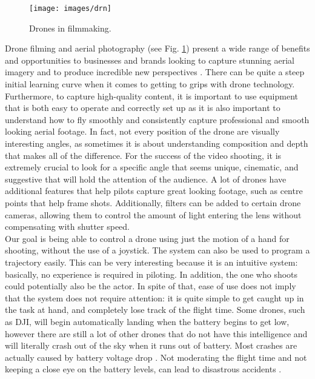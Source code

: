 \begin{figure}[H]
	\centering
	\texttt{[image: images/drn]}
	\caption[Drones in filmmaking.]{Drones in filmmaking.}
	\label{fig:drnfilm}
\end{figure}

\noindent Drone filming and aerial photography (see Fig. \ref{fig:drnfilm}) present a wide range of benefits and opportunities to businesses and brands looking to capture stunning aerial imagery and to produce incredible new perspectives \cite[]{TopTipsf86:online}. There can be quite a steep initial learning curve when it comes to getting to grips with drone technology. Furthermore, to capture high-quality content, it is important to use equipment that is both easy to operate and correctly set up as it is also important to understand how to fly smoothly and consistently capture professional and smooth looking aerial footage. In fact, not every position of the drone are visually interesting angles, as sometimes it is about understanding composition and depth that makes all of the difference. For the success of the video shooting, it is extremely crucial to look for a specific angle that seems unique, cinematic, and suggestive that will hold the attention of the audience. A lot of drones have additional features that help pilots capture great looking footage, such as centre points that help frame shots. Additionally, filters can be added to certain drone cameras, allowing them to control the amount of light entering the lens without compensating with shutter speed. \\

\noindent Our goal is being able to control a drone using just the motion of a hand for shooting, without the use of a joystick. The system can also be used to program a trajectory easily. This can be very interesting because it is an intuitive system: basically, no experience is required in piloting. In addition, the one who shoots could potentially also be the actor. In spite of that, ease of use does not imply that the system does not require attention: it is quite simple to get caught up in the task at hand, and completely lose track of the flight time. Some drones, such as DJI, will begin automatically landing when the battery begins to get low, however there are still a lot of other drones that do not have this intelligence and will literally crash out of the sky when it runs out of battery. Most crashes are actually caused by battery voltage drop \cite[]{WhatHapp70:online}. Not moderating the flight time and not keeping a close eye on the battery levels, can lead to disastrous accidents \cite[]{ListofUA81:online}. \\

